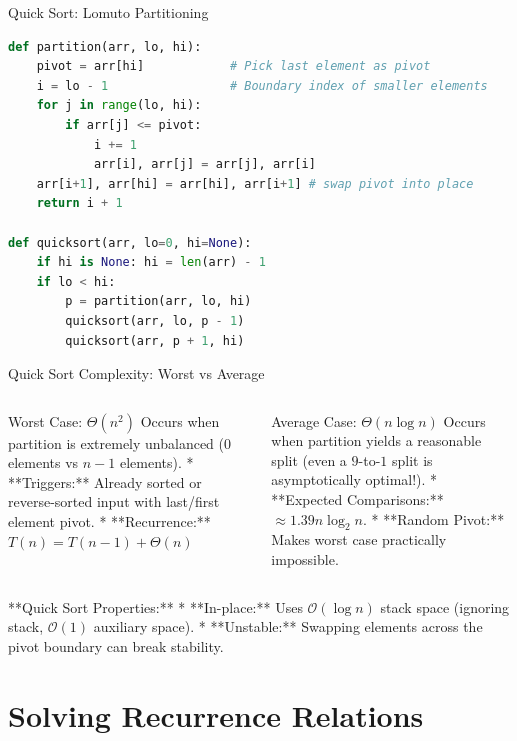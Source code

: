 \documentclass[aspectratio=169,xcolor=dvipsnames]{beamer}
\begin{document}
\begin{frame}[fragile]{Quick Sort: Lomuto Partitioning}
  \begin{lstlisting}[language=Python]
def partition(arr, lo, hi):
    pivot = arr[hi]            # Pick last element as pivot
    i = lo - 1                 # Boundary index of smaller elements
    for j in range(lo, hi):
        if arr[j] <= pivot:
            i += 1
            arr[i], arr[j] = arr[j], arr[i]
    arr[i+1], arr[hi] = arr[hi], arr[i+1] # swap pivot into place
    return i + 1

def quicksort(arr, lo=0, hi=None):
    if hi is None: hi = len(arr) - 1
    if lo < hi:
        p = partition(arr, lo, hi)
        quicksort(arr, lo, p - 1)
        quicksort(arr, p + 1, hi)
  \end{lstlisting}
\end{frame}

\begin{frame}{Quick Sort Complexity: Worst vs Average}
  \begin{columns}
    \begin{alertblock}{Worst Case: $\Theta(n^2)$}
      Occurs when partition is extremely unbalanced ($0$ elements vs $n-1$ elements).
      * **Triggers:** Already sorted or reverse-sorted input with last/first element pivot.
      * **Recurrence:** $T(n) = T(n-1) + \Theta(n)$
    \end{alertblock}
    \begin{exampleblock}{Average Case: $\Theta(n \log n)$}
      Occurs when partition yields a reasonable split (even a $9$-to-$1$ split is asymptotically optimal!).
      * **Expected Comparisons:** $\approx 1.39 n \log_2 n$.
      * **Random Pivot:** Makes worst case practically impossible.
    \end{exampleblock}
  \end{columns}
  \vspace{0.5em}
  **Quick Sort Properties:**
  * **In-place:** Uses $\mathcal{O}(\log n)$ stack space (ignoring stack, $\mathcal{O}(1)$ auxiliary space).
  * **Unstable:** Swapping elements across the pivot boundary can break stability.
\end{frame}

\section{Solving Recurrence Relations}
\end{document}
